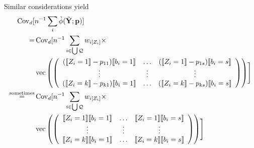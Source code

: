 \documentclass{article}
\DeclarePairedDelimiter{\indicator}{\llbracket}{\rrbracket}
\newcommand{\owt}[1][z_i]{\ensuremath{w_{i[#1]}}}
\begin{document}
Similar considerations yield
\begin{align}
\operatorname{Cov}_{d}[
  &n^{-1}\sum_{i}\grave{\phi}(\tilde{\mathbf{Y}}; \mathbf{p})] \nonumber\\
  =&\operatorname{Cov}_{d}[n^{-1}
                                                 \sum_{i \in \bigcup
     \mathcal{Q}} \owt[Z_{i}] \times \nonumber \\
&  \operatorname{vec}\left(%
                                                 \left(
                                                 \begin{array}{ccc}
                                                   (\indicator{Z_{i}=1}-p_{11})\indicator{b_{i}=1}&\ldots&(\indicator{Z_{i}=1}-p_{1s})\indicator{b_{i}=s}\\
                                                   \vdots & \vdots &
                                                                     \vdots
                                                   \\
                                                   (\indicator{Z_{i}=k}-p_{k1})\indicator{b_{i}=1}&\ldots&(\indicator{Z_{i}=k}-p_{ks})\indicator{b_{i}=s}\\                                                   
                                                 \end{array}
  \right)%
  \right)
  \Biggr] \nonumber \\ 
  \stackrel{\text{sometimes}}{=}&\operatorname{Cov}_{d}[n^{-1}
                                                 \sum_{i \in \bigcup
     \mathcal{Q}} \owt[Z_{i}] \times \nonumber \\
  &\operatorname{vec}\left(%
                                                 \left(
                                                 \begin{array}{ccc}
                                                   \indicator{Z_{i}=1}\indicator{b_{i}=1}&\ldots&\indicator{Z_{i}=1}\indicator{b_{i}=s}\\
                                                   \vdots & \vdots &
                                                                     \vdots
                                                   \\
                                                   \indicator{Z_{i}=k}\indicator{b_{i}=1}&\ldots&\indicator{Z_{i}=k}\indicator{b_{i}=s}\\                                                   
                                                 \end{array}  
  \right)%
  \right)
    \Biggr] \label{eq:11}
\end{align}
\end{document}
